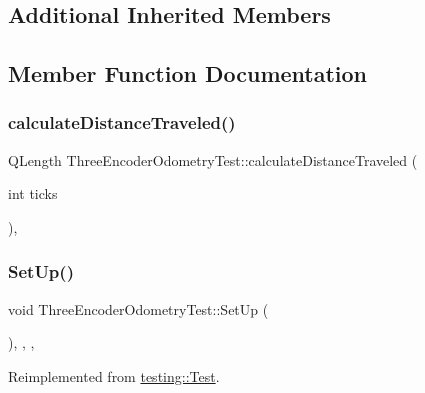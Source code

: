 \subsection*{Additional Inherited Members}


\subsection{Member Function Documentation}
\mbox{\label{classThreeEncoderOdometryTest_a46a488d3ec003cf11bfc9fd70b98436a}} 
\subsubsection{\texorpdfstring{calculateDistanceTraveled()}{calculateDistanceTraveled()}}
{\footnotesize\ttfamily Q\+Length Three\+Encoder\+Odometry\+Test\+::calculate\+Distance\+Traveled (\begin{DoxyParamCaption}\item[{int}]{ticks }\end{DoxyParamCaption})\hspace{0.3cm}{\ttfamily [inline]}, {\ttfamily [protected]}}

\mbox{\label{classThreeEncoderOdometryTest_ac8090894120fcfde281fc9dfc0d626f0}} 
\subsubsection{\texorpdfstring{SetUp()}{SetUp()}}
{\footnotesize\ttfamily void Three\+Encoder\+Odometry\+Test\+::\+Set\+Up (\begin{DoxyParamCaption}{ }\end{DoxyParamCaption})\hspace{0.3cm}{\ttfamily [inline]}, {\ttfamily [override]}, {\ttfamily [protected]}, {\ttfamily [virtual]}}



Reimplemented from \mbox{\hyperlink{classtesting_1_1Test_a190315150c303ddf801313fd1a777733}{testing\+::\+Test}}.

